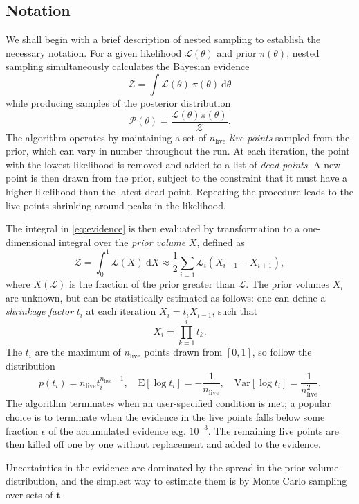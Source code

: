 \documentclass[usenatbib]{mnras}
\newcommand{\nlive}{n_\mathrm{live}}
\newcommand{\Like}{\mathcal{L}}
\begin{document}
\subsection{Notation}
We shall begin with a brief description of nested sampling to establish the necessary notation. For a given likelihood $\Like(\theta)$ and prior $\pi(\theta)$, nested sampling simultaneously calculates the Bayesian evidence
\begin{equation}\label{eq:evidence}
	\mathcal{Z} = \int \Like(\theta)\ \pi(\theta)\ \mathrm{d}\theta
\end{equation}
while producing samples of the posterior distribution 
\begin{equation}
	\mathcal{P}(\theta) = \frac{\Like(\theta) \pi(\theta)}{\mathcal{Z}}.
\end{equation}
The algorithm operates by maintaining a set of $\nlive$ \textit{live points} sampled from the prior, which can vary in number throughout the run. At each iteration, the point with the lowest likelihood is removed and added to a list of \textit{dead points}. A new point is then drawn from the prior, subject to the constraint that it must have a higher likelihood than the latest dead point. Repeating the procedure leads to the live points shrinking around peaks in the likelihood. 
\par
The integral in \cref{eq:evidence} is then evaluated by transformation to a one-dimensional integral over the \textit{prior volume} $X$, defined as
\begin{equation}
	\mathcal{Z} = \int_0^1 \Like(X)\ \mathrm{d}X \approx \frac{1}{2}\sum_{i=1} \Like_i (X_{i-1}-X_{i+1}),
\end{equation}
where $X(\Like)$ is the fraction of the prior greater than $\Like$. The prior volumes $X_i$ are unknown, but can be statistically estimated as follows: one can define a \textit{shrinkage factor} $t_i$ at each iteration $X_{i} = t_i X_{i-1}$, such that
\begin{equation}
	X_i = \prod_{k=1}^i t_k.
\end{equation}
The $t_i$ are the maximum of $\nlive$ points drawn from $[0,1]$, so follow the distribution
\begin{equation}\label{eq:t_dist}
	p(t_i) = \nlive t_i^{\nlive-1}, \quad \mathrm{E}[\log t_i] = -\frac{1}{\nlive}, \quad \mathrm{Var}[\log t_i] = \frac{1}{\nlive^2}.
\end{equation}
The algorithm terminates when an user-specified condition is met; a popular choice is to terminate when the evidence in the live points falls below some fraction $\epsilon$ of the accumulated evidence e.g. $10^{-3}$. The remaining live points are then killed off one by one without replacement and added to the evidence. 
\par
Uncertainties in the evidence are dominated by the spread in the prior volume distribution, and the simplest way to estimate them is by Monte Carlo sampling over sets of $\bm{t}$. 
\end{document}
